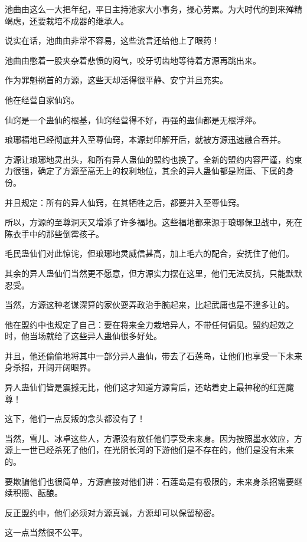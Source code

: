 
\begin{this_body}

池曲由这么一大把年纪，平日主持池家大小事务，操心劳累。为大时代的到来殚精竭虑，还要栽培不成器的继承人。

说实在话，池曲由非常不容易，这些流言还给他上了眼药！

池曲由憋着一股夹杂着悲愤的闷气，咬牙切齿地等待着方源再跳出来。

作为罪魁祸首的方源，这些天却活得很平静、安宁并且充实。

他在经营自家仙窍。

仙窍是一个蛊仙的根基，仙窍经营得不好，再强的蛊仙都是无根浮萍。

琅琊福地已经彻底并入至尊仙窍，本源封印解开后，就被方源迅速融合吞并。

方源让琅琊地灵出头，和所有异人蛊仙的盟约也换了。全新的盟约内容严谨，约束力很强，确定了方源至高无上的权利地位，其余的异人蛊仙都是附庸、下属的身份。

并且规定：所有的异人仙窍，在其牺牲之后，都要并入至尊仙窍。

所以，方源的至尊洞天又增添了许多福地。这些福地都来源于琅琊保卫战中，死在陈衣手中的那些倒霉孩子。

毛民蛊仙们对此惊诧，但琅琊地灵威信甚高，加上毛六的配合，安抚住了他们。

其余的异人蛊仙们当然更不愿意，但方源实力摆在这里，他们无法反抗，只能默默忍受。

当然，方源这种老谋深算的家伙耍弄政治手腕起来，比起武庸也是不遑多让的。

他在盟约中也规定了自己：要在将来全力栽培异人，不带任何偏见。盟约起效之时，他当场就给了这些异人蛊仙很多好处。

并且，他还偷偷地将其中一部分异人蛊仙，带去了石莲岛，让他们也享受一下未来身杀招，开阔开阔眼界。

异人蛊仙们皆是震撼无比，他们这才知道方源背后，还站着史上最神秘的红莲魔尊！

这下，他们一点反叛的念头都没有了！

当然，雪儿、冰卓这些人，方源没有放任他们享受未来身。因为按照墨水效应，方源上一世已经杀死了他们，在光阴长河的下游他们是不存在的，他们是没有未来的。

要欺骗他们也很简单，方源直接对他们讲：石莲岛是有极限的，未来身杀招需要继续积攒、酝酿。

反正盟约中，他们必须对方源真诚，方源却可以保留秘密。

这一点当然很不公平。


\end{this_body}
